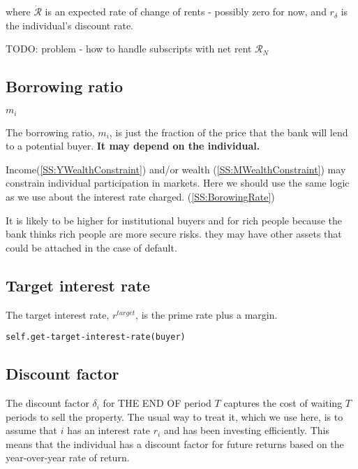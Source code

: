 \noindent where $\dot{\mathcal{R}}$ is an expected rate of change of rents - possibly zero for now, and $r_\delta$ is the individual's discount rate. 

TODO: problem - how to handle subscripts with net rent $\mathcal{R}_N$



\subsection{Borrowing ratio}\label{SS:BorrowingRatio}
$m_i$

The borrowing ratio, $m_i$, is just the fraction of the price that the bank will lend to a potential buyer. \textbf{It may depend on the individual.} 

Income(\ref{SS:YWealthConstraint}) and/or wealth (\ref {SS:MWealthConstraint}) may constrain individual participation in markets. 
Here we should use the same logic as we use about the interest rate charged. (\ref{SS:BorowingRate})

It is likely to be higher for institutional buyers  and for rich people because the bank thinks rich people are more secure risks. they may have other assets that could be attached in the case of default.



\subsection{Target interest rate}\label{SS:targetr}

 The target interest rate, $r^{target}$, is the prime rate plus a margin. %

\begin{verbatim}
self.get-target-interest-rate(buyer)
\end{verbatim}



\subsection{Discount factor}\label{SS:discountfactor}

The discount factor $\delta_i$ for THE END OF period $T$ captures the cost of waiting $T$ periods to sell the property. The usual way to treat it, which we use here, is to assume that $i$ has an interest rate $r_i$ and has been investing efficiently. This means that  the individual has a discount factor for future returns based on the year-over-year rate of return. 

